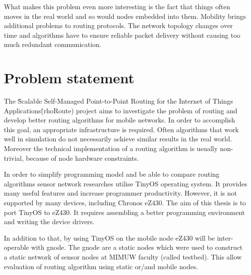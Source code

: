 What makes this problem even more interesting is the fact that things often moves in the real world and so would nodes embedded into them.
Mobility brings additional problems to routing protocols.
The network topology changes over time and algorithms have to ensure reliable packet delivery without causing too much redundant communication.


\section{Problem statement}
The \"Scalable Self-Managed Point-to-Point Routing for the Internet of Things Applications\" (rhoRoute) project aims to investigate the problem of routing and develop better routing algorithms for mobile networks.
In order to accomplish this goal, an appropriate infrastructure is required.
Often algorithms that work well in simulation do not necessarily achieve similar results in the real world. Moreover the technical implementation of a routing algorithm is usually non-trivial, because of node hardware constraints.

In order to simplify programming model and be able to compare routing algorithms sensor network researches utilise TinyOS operating system. It provides many useful features and increase programmer productivity. However, it is not supported by many devices, including Chronos eZ430. The aim of this thesis is to port TinyOS to eZ430. It requires assembling a better programming environment and writing the device drivers.

In addition to that, by using TinyOS on the mobile node eZ430 will be inter-operable with gnode. The gnode are a static nodes which were used to construct a static network of sensor nodes at MIMUW faculty (called testbed). This allow evaluation of routing algorithm using static or/and mobile nodes. 

